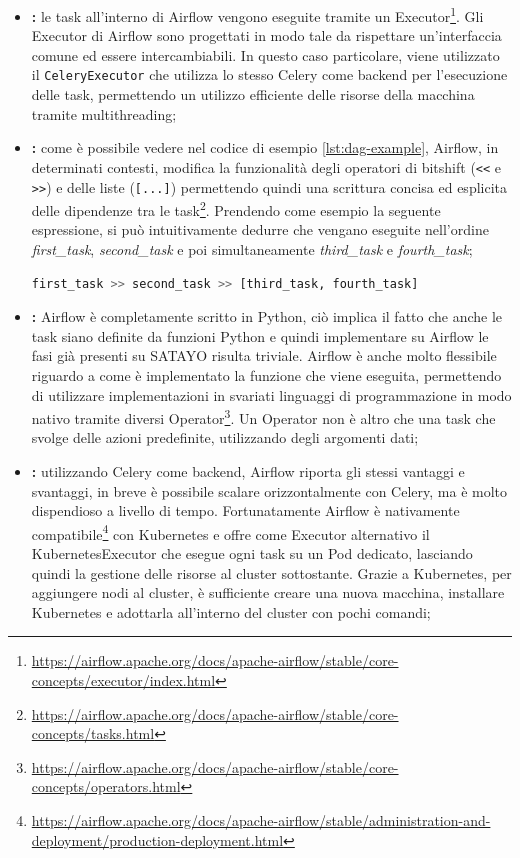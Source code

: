 \begin{itemize}
  \item \textbf{:} le task all'interno di Airflow
    vengono eseguite tramite un Executor\footnote{\url{https://airflow.apache.org/docs/apache-airflow/stable/core-concepts/executor/index.html}}.
    Gli Executor di Airflow sono progettati in modo tale da rispettare un'interfaccia
    comune ed essere intercambiabili. In questo caso particolare, viene
    utilizzato il \texttt{CeleryExecutor} che utilizza lo stesso Celery come backend
    per l'esecuzione delle task, permettendo un utilizzo efficiente delle
    risorse della macchina tramite multithreading;

  \item \textbf{:} come è possibile vedere nel
    codice di esempio \ref{lst:dag-example}, Airflow, in determinati contesti, modifica
    la funzionalità degli operatori di bitshift (\texttt{<<} e \texttt{>>}) e delle
    liste (\texttt{[...]}) permettendo quindi una scrittura concisa ed esplicita
    delle dipendenze tra le task\footnote{\url{https://airflow.apache.org/docs/apache-airflow/stable/core-concepts/tasks.html}}.
    Prendendo come esempio la seguente espressione, si può intuitivamente dedurre
    che vengano eseguite nell'ordine \textit{first\_task}, \textit{second\_task}
    e poi simultaneamente \textit{third\_task} e \textit{fourth\_task};

    \begin{lstlisting}[language=Python]
first_task >> second_task >> [third_task, fourth_task]
\end{lstlisting}

  \item \textbf{:} Airflow è completamente
    scritto in Python, ciò implica il fatto che anche le task siano definite da funzioni
    Python e quindi implementare su Airflow le fasi già presenti su SATAYO risulta
    triviale. Airflow è anche molto flessibile riguardo a come è implementato la
    funzione che viene eseguita, permettendo di utilizzare implementazioni in svariati
    linguaggi di programmazione in modo nativo tramite diversi Operator\footnote{\url{https://airflow.apache.org/docs/apache-airflow/stable/core-concepts/operators.html}}.
    Un Operator non è altro che una task che svolge delle azioni predefinite,
    utilizzando degli argomenti dati;

  \item \textbf{:} utilizzando Celery come backend, Airflow
    riporta gli stessi vantaggi e svantaggi, in breve è possibile scalare
    orizzontalmente con Celery, ma è molto dispendioso a livello di tempo.
    Fortunatamente Airflow è nativamente compatibile\footnote{\url{https://airflow.apache.org/docs/apache-airflow/stable/administration-and-deployment/production-deployment.html}}
    con Kubernetes e offre come Executor alternativo il KubernetesExecutor che esegue
    ogni task su un Pod dedicato, lasciando quindi la gestione delle risorse al
    cluster sottostante. Grazie a Kubernetes, per aggiungere nodi al cluster, è sufficiente
    creare una nuova macchina, installare Kubernetes e adottarla all'interno del
    cluster con pochi comandi;


\end{itemize}
